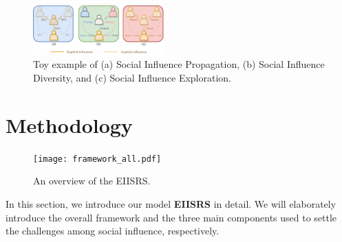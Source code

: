 \documentclass[letterpaper]{article} %
\begin{document}
\begin{figure}[ht!]
  \centering
  \includegraphics[width=0.451\textwidth]{motivation.pdf} %
  \caption{Toy example of (a) Social Influence Propagation, (b) Social Influence Diversity, and (c) Social Influence Exploration.}
  \label{fig_motivation}
\end{figure}

\section{Methodology}
\begin{figure}[ht]
  \centering
  \texttt{[image: framework\_all.pdf]}
  \caption{An overview of the EIISRS.}
  \label{framework_all.pdf}
\end{figure}
In this section, we introduce our model \textbf{EIISRS} in detail. We will elaborately introduce the overall framework and the three main components used to settle the challenges among social influence, respectively.
\end{document}
